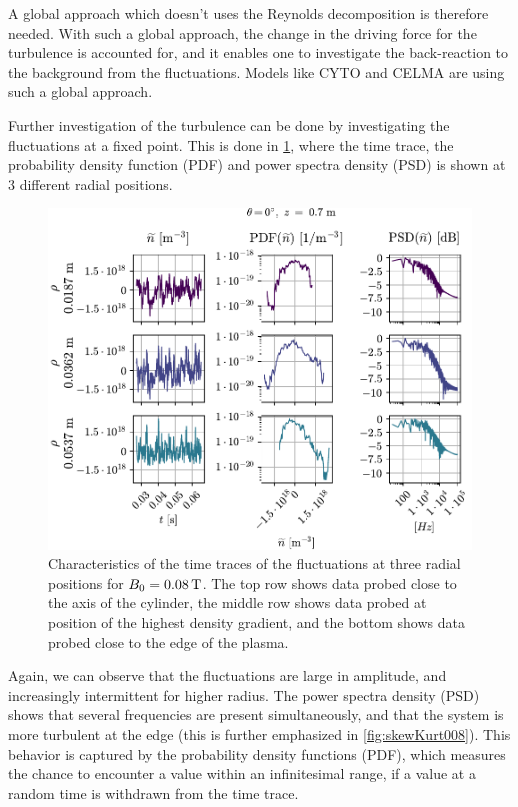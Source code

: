 A global approach which doesn't uses the Reynolds decomposition is therefore needed.
With such a global approach, the change in the driving force for the turbulence is accounted for, and it enables one to investigate the back-reaction to the background from the fluctuations.
Models like CYTO \cite{Naulin2008,Windisch2011a,Windisch2011b} and CELMA are using such a global approach.

Further investigation of the turbulence can be done by investigating the fluctuations at a fixed point.
This is done in \cref{fig:combinedPlots008}, where the time trace, the probability density function (PDF) and power spectra density (PSD) is shown at $3$ different radial positions.
%
\begin{figure}[htb]
    \centering
    \includegraphics{fig/results/combinedPlots/008T}
    \caption{Characteristics of the time traces of the fluctuations at three radial positions for $B_0=0.08\, \text{T}$.
        The top row shows data probed close to the axis of the cylinder,
        the middle row shows data probed at position of the highest density gradient,
        and the bottom shows data probed close to the edge of the plasma.
    }
    \label{fig:combinedPlots008}
\end{figure}
%
Again, we can observe that the fluctuations are large in amplitude, and increasingly intermittent for higher radius.
The power spectra density (PSD) shows that several frequencies are present simultaneously, and that the system is more turbulent at the edge (this is further emphasized in \cref{fig:skewKurt008}).
This behavior is captured by the probability density functions (PDF), which measures the chance to encounter a value within an infinitesimal range, if a value at a random time is withdrawn from the time trace.
